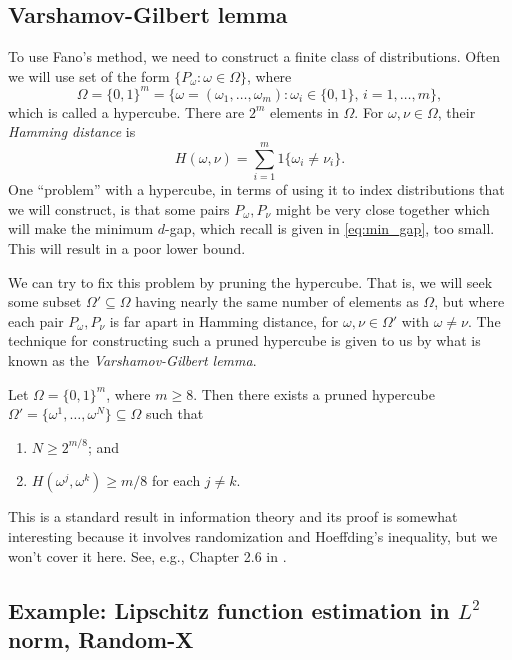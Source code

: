 \documentclass{article}
\begin{document}
\subsection{Varshamov-Gilbert lemma}

To use Fano's method, we need to construct a finite class of
distributions. Often we will use set of the form $\{P_\omega : \omega \in
\Omega\}$, where  
\[
\Omega = \{0,1\}^m = \Big\{ \omega = (\omega_1,\dots,\omega_m) : \omega_i \in
\{0,1\}, \, i=1,\dots,m \Big\},
\]
which is called a hypercube. There are $2^m$ elements in $\Omega$. For $\omega,
\nu\in \Omega$, their \emph{Hamming distance} is  
\[
H(\omega,\nu) = \sum_{i=1}^m 1\{ \omega_i \not= \nu_i \}.
\]
One ``problem'' with a hypercube, in terms of using it to index distributions
that we will construct, is that some pairs $P_\omega, P_\nu$ might be very close
together which will make the minimum $d$-gap, which recall is given in
\eqref{eq:min_gap}, too small. This will result in a poor lower bound.  

We can try to fix this problem by pruning the hypercube. That is, we will seek some
subset $\Omega' \subseteq \Omega$ having nearly the same number of elements
as $\Omega$, but where each pair $P_\omega, P_\nu$ is far apart in Hamming
distance, for $\omega, \nu \in \Omega'$ with $\omega \not= \nu$. The technique
for constructing such a pruned hypercube is given to us by what is known as the
\emph{Varshamov-Gilbert lemma}.   

\begin{lemma}
\label{lem:vg}
Let $\Omega = \{0,1\}^m$, where $m \geq 8$. Then there exists a pruned hypercube
$\Omega' = \{ \omega^1,\dots,\omega^N \} \subseteq \Omega$ such that         
\begin{enumerate}
\item $N \geq 2^{m/8}$; and
\item $H(\omega^j,\omega^k) \geq m/8$ for each $j \not= k$.
\end{enumerate}
\end{lemma}

This is a standard result in information theory and its proof is somewhat
interesting because it involves randomization and Hoeffding's inequality, but we
won't cover it here. See, e.g., Chapter 2.6 in \citet{tsybakov2009introduction}.

\subsection{Example: Lipschitz function estimation in $L^2$ norm, Random-X}  
\label{sec:lipschitz_L2}
\end{document}

